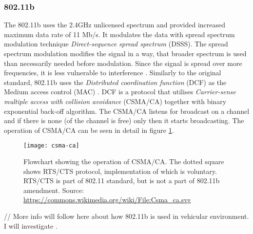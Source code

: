 \subsubsection{802.11b}
% 
The 802.11b uses the 2.4GHz unlicensed spectrum and provided increased maximum data rate of 11 Mb/s. It  modulates the data with spread spectrum modulation technique \emph{Direct-sequence spread spectrum} (DSSS). The spread spectrum modulation modifies the signal in a way, that broader spectrum is used than necessarily needed before modulation. Since the signal is spread over more frequencies, it is less vulnerable to interference \cite{MaximIntegratedProductsInc.2013AnMaxim}.
Similarly to the original standard, 802.11b uses the \emph{Distributed coordination function} (DCF) as the Medium access control (MAC) \cite{Hiertz2010TheUniverse}. DCF is a protocol that utilises \emph{Carrier-sense multiple access with collision avoidance} (CSMA/CA) together with binary exponential back-off algorithm. The CSMA/CA listens for broadcast on a channel and if there is none (of the channel is free) only then it starts broadcasting. The operation of CSMA/CA can be seen in detail in figure \ref{fig:csma-ca}.
% 
\begin{figure}
    \centering
    \texttt{[image: csma-ca]}
    \caption{Flowchart showing the operation of CSMA/CA. The dotted square shows RTS/CTS protocol, implementation of which is voluntary. RTS/CTS is part of 802.11 standard, but is not a part of 802.11b amendment. Source: \url{https://commons.wikimedia.org/wiki/File:Csma_ca.svg}}
    \label{fig:csma-ca}
\end{figure}
% 
\par // More info will follow here about how 802.11b is used in vehicular environment. I will investigate \cite{Bilgin2013PerformanceAreas}.
